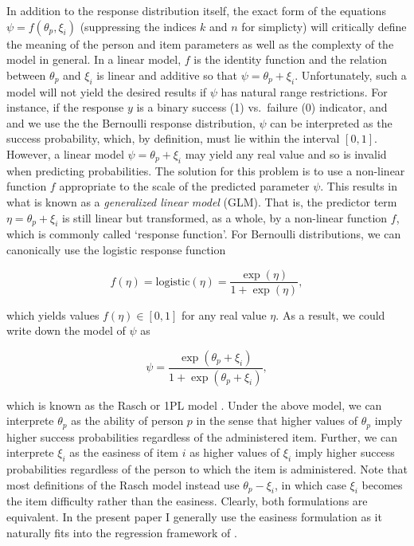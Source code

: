 \documentclass[jss]{jss}
\begin{document}
In addition to the response distribution itself, the exact form of the
equations \(\psi = f(\theta_p, \xi_i)\) (suppressing the indices \(k\)
and \(n\) for simplicty) will critically define the meaning of the
person and item parameters as well as the complexty of the model in
general. In a linear model, \(f\) is the identity function and the
relation between \(\theta_p\) and \(\xi_i\) is linear and additive so
that \(\psi = \theta_p + \xi_i\). Unfortunately, such a model will not
yield the desired results if \(\psi\) has natural range restrictions.
For instance, if the response \(y\) is a binary success (1) vs.~failure
(0) indicator, and and we use the the Bernoulli response distribution,
\(\psi\) can be interpreted as the success probability, which, by
definition, must lie within the interval \([0, 1]\). However, a linear
model \(\psi = \theta_p + \xi_i\) may yield any real value and so is
invalid when predicting probabilities. The solution for this problem is
to use a non-linear function \(f\) appropriate to the scale of the
predicted parameter \(\psi\). This results in what is known as a
\emph{generalized linear model} (GLM). That is, the predictor term
\(\eta = \theta_p + \xi_i\) is still linear but transformed, as a whole,
by a non-linear function \(f\), which is commonly called `response
function'. For Bernoulli distributions, we can canonically use the
logistic response function

\[
f(\eta) = \text{logistic}(\eta) = \frac{\exp(\eta)}{1 + \exp(\eta)},
\]

which yields values \(f(\eta) \in [0, 1]\) for any real value \(\eta\).
As a result, we could write down the model of \(\psi\) as

\[
\psi = \frac{\exp(\theta_p + \xi_i)}{1 + \exp(\theta_p + \xi_i)},
\]

which is known as the Rasch or 1PL model \citep{bond2013}. Under the
above model, we can interprete \(\theta_p\) as the ability of person
\(p\) in the sense that higher values of \(\theta_p\) imply higher
success probabilities regardless of the administered item. Further, we
can interprete \(\xi_i\) as the easiness of item \(i\) as higher values
of \(\xi_i\) imply higher success probabilities regardless of the person
to which the item is administered. Note that most definitions of the
Rasch model instead use \(\theta_p - \xi_i\), in which case \(\xi_i\)
becomes the item difficulty rather than the easiness. Clearly, both
formulations are equivalent. In the present paper I generally use the
easiness formulation as it naturally fits into the regression framework
of .
\end{document}
